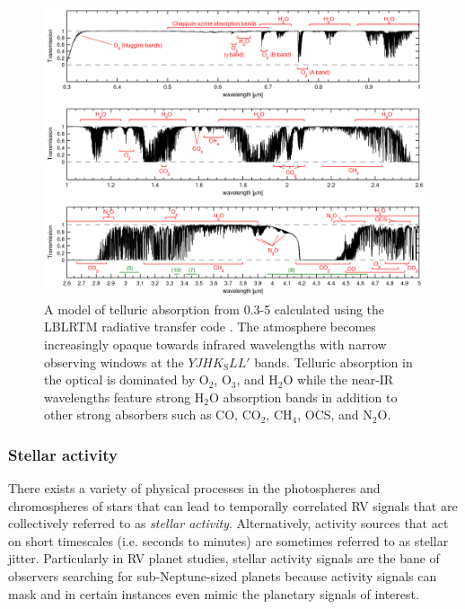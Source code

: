 \begin{figure}
  \centering
  \includegraphics[width=0.8\hsize]{figures/transmittancev2.png}
  \caption[Atmospheric transmission from 0.3-5 $\mu$m.]
          {A model of telluric absorption from 0.3-5 \micron{} calculated using the LBLRTM radiative transfer
            code \citep{clough05}. The atmosphere becomes increasingly opaque towards infrared wavelengths with
            narrow observing windows at the $YJHK_{\text{S}}LL'$ bands. Telluric absorption in the optical is
            dominated by O$_2$, O$_3$, and H$_2$O while the near-IR wavelengths feature strong H$_2$O absorption
            bands in addition to other strong absorbers such as CO, CO$_2$, CH$_4$, OCS, and N$_2$O.
            \citep[Image credit:][]{smette15}}
  \label{fig:transmission}
\end{figure}

\subsubsection{Stellar activity} \label{sect:activity}
There exists a variety of physical processes in the photospheres and chromospheres of stars that
can lead to temporally correlated RV signals that are collectively
referred to as \emph{stellar activity}. Alternatively, activity sources that act on short timescales
(i.e. seconds to minutes) are sometimes referred to as stellar jitter.
Particularly in RV planet studies, stellar activity
signals are the bane of observers searching for sub-Neptune-sized planets because activity signals
can mask and in certain instances even mimic the planetary signals of interest. \\

